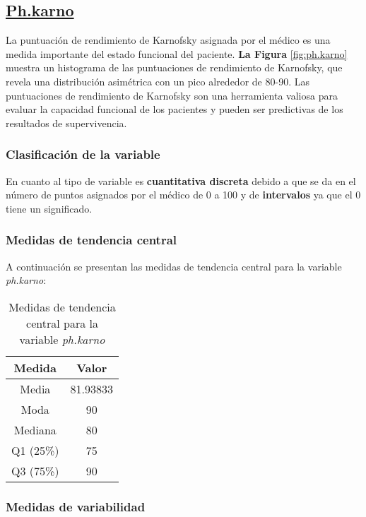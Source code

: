 \documentclass[a4paper,12pt]{article}
\begin{document}
    \subsection*{\underline{Ph.karno}}

    La puntuación de rendimiento de Karnofsky asignada por el médico es una medida importante del estado funcional del paciente. \textbf{La Figura }\ref{fig:ph.karno} muestra un histograma de las puntuaciones de rendimiento de Karnofsky, que revela una distribución asimétrica con un pico alrededor de 80-90. Las puntuaciones de rendimiento de Karnofsky son una herramienta valiosa para evaluar la capacidad funcional de los pacientes y pueden ser predictivas de los resultados de supervivencia.

    \subsubsection*{Clasificación de la variable}

    En cuanto al tipo de variable es \textbf{cuantitativa discreta} debido a que se da en el número de puntos asignados por el médico de 0 a 100 y de \textbf{intervalos} ya que el 0 tiene un significado.

    \subsubsection*{Medidas de tendencia central}

A continuación se presentan las medidas de tendencia central para la variable \textit{ph.karno}:

\begin{table}[h!]
    \centering
    \begin{tabular}{|c|c|}
        \hline
        \textbf{Medida} & \textbf{Valor} \\
        \hline
        Media & 81.93833 \\
        \hline
        Moda & 90 \\
        \hline
        Mediana & 80 \\
        \hline
        Q1 (25\%) & 75 \\
        \hline
        Q3 (75\%) & 90 \\
        \hline
    \end{tabular}
    \caption{Medidas de tendencia central para la variable \textit{ph.karno}}
    \label{tab:medidas_tendencia_central_ph_karno}
\end{table}

\subsubsection*{Medidas de variabilidad}
\end{document}
